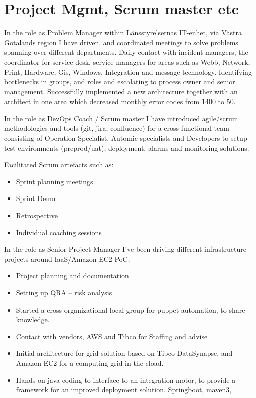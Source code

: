\documentclass[11pt,a4paper,sans]{moderncv}
\begin{document}
\large
\section {Project Mgmt, Scrum master etc}


In the role as Problem Manager within Länsstyrelsernas IT-enhet, via Västra Götalands region I have driven, and coordinated meetings to solve problems spanning over different departments. Daily contact with incident managers, the coordinator for service desk, service managers for areas such as Webb, Network, Print, Hardware, Gis, Windows, Integration and message technology. Identifying bottlenecks in groups, and roles and escalating to process owner and senior management. Successfully implemented a new architecture together with an architect in one area which decreased monthly error codes from 1400 to 50.  

In the role as DevOps Coach / Scrum master I have introduced agile/scrum methodologies and tools (git, jira, confluence) for a cross-functional team consisting of Operation Specialist, Automic specialists and Developers to setup test environments (preprod/uat), deployment, alarms and monitoring solutions. 

Facilitated Scrum artefacts such as: 
\begin{itemize}
    \item Sprint planning meetings 
    \item Sprint Demo 
    \item Retrospective 
    \item Individual coaching sessions 
\end{itemize}

In the role as Senior Project Manager I’ve been driving different infrastructure projects around IaaS/Amazon EC2 PoC: 
\begin{itemize}
    \item Project planning and documentation 
    \item Setting up QRA – risk analysis  
    \item Started a cross organizational local group for puppet automation, to share knowledge.
    \item Contact with vendors, AWS and Tibco for Staffing and advise 
    \item Initial architecture for grid solution based on Tibco DataSynapse, and Amazon EC2 for a computing grid in the cload. 
    \item Hands-on java coding to interface to an integration motor, to provide a framework for an improved deployment solution. Springboot, maven3,  
\end{itemize}
\end{document}
